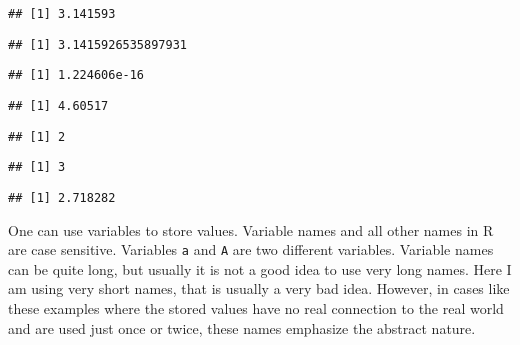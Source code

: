 \documentclass[paper=a4,headsepline,BCOR=12mm,twoside,open=right,%
titlepage,headings=small,fontsize=10pt,index=totoc,bibliography=totoc,%
captions=tableheading,captions=nooneline]{scrbook}\usepackage{knitr}
\begin{document}
\begin{knitrout}
\begin{kframe}
\begin{alltt}
 
\end{alltt}
\begin{verbatim}
## [1] 3.141593
\end{verbatim}
\begin{alltt}
 \hlstd{=}\hlstd{)}
\end{alltt}
\begin{verbatim}
## [1] 3.1415926535897931
\end{verbatim}
\begin{alltt}
 
\end{alltt}
\begin{verbatim}
## [1] 1.224606e-16
\end{verbatim}
\begin{alltt}
\hlstd{(}\hlstd{)}
\end{alltt}
\begin{verbatim}
## [1] 4.60517
\end{verbatim}
\begin{alltt}
\hlstd{(}\hlstd{)}
\end{alltt}
\begin{verbatim}
## [1] 2
\end{verbatim}
\begin{alltt}
\hlstd{(}\hlstd{)}
\end{alltt}
\begin{verbatim}
## [1] 3
\end{verbatim}
\begin{alltt}
\hlstd{(}\hlstd{)}
\end{alltt}
\begin{verbatim}
## [1] 2.718282
\end{verbatim}
\end{kframe}
\end{knitrout}

One can use variables to store values. Variable names and all other names in R are case sensitive. Variables \texttt{a} and \texttt{A} are two different variables. Variable names can be quite long, but usually it is not a good idea to use very long names. Here I am using very short names, that is usually a very bad idea. However, in cases like these examples where the stored values have no real connection to the real world and are used just once or twice, these names emphasize the abstract nature.
\end{document}
